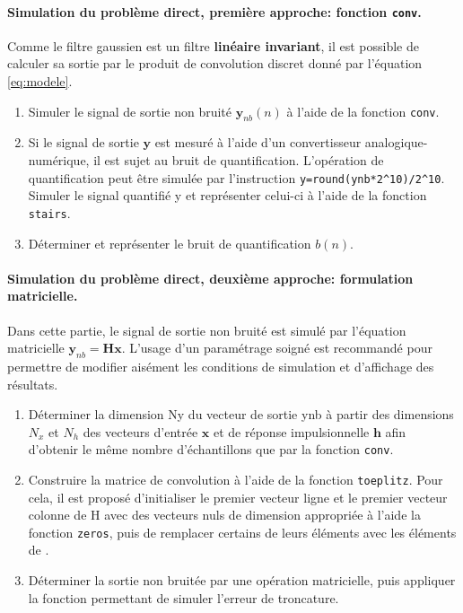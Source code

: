\paragraph{Simulation du problème direct, première approche: fonction \texttt{conv}.} Comme le filtre gaussien est un filtre \textbf{linéaire invariant}, il est possible de calculer sa sortie par le produit de convolution discret donné par l'équation \eqref{eq:modele}.
\begin{enumerate}
	\item Simuler le signal de sortie non bruité $\bm{y}_{nb}(n)$ à l'aide de la fonction \texttt{conv}.
	\item Si le signal de sortie $\bm{y}$ est mesuré à l'aide d'un convertisseur analogique-numérique, il est sujet au bruit de quantification. L'opération de quantification peut être simulée par l'instruction \texttt{y=round(ynb*2\^{}10)/2\^{}10}. Simuler le signal quantifié y et représenter celui-ci à l'aide de la fonction \texttt{stairs}.
	\item Déterminer et représenter le bruit de quantification $b(n)$.
\end{enumerate}

\paragraph{Simulation du problème direct, deuxième approche: formulation matricielle.} Dans cette partie, le signal de sortie non bruité est simulé par l'équation matricielle $\bm{y}_{nb} = \bm{H}\bm{x}$. L'usage d'un paramétrage soigné est recommandé pour permettre de modifier aisément les conditions de simulation et d'affichage des résultats.
\begin{enumerate}
	\item Déterminer la dimension Ny du vecteur de sortie ynb à partir des dimensions $N_x$ et $N_h$ des vecteurs d'entrée $\bm{x}$ et de réponse impulsionnelle $\bm{h}$ afin d'obtenir le même nombre d'échantillons que par la fonction \texttt{conv}.
	\item Construire la matrice de convolution  à l'aide de la fonction \texttt{toeplitz}. Pour cela, il est proposé d'initialiser le premier vecteur ligne et le premier vecteur colonne de H avec des vecteurs nuls de dimension appropriée à l'aide la fonction \texttt{zeros}, puis de remplacer certains de leurs éléments avec les éléments de .
	\item Déterminer la sortie non bruitée par une opération matricielle, puis appliquer la fonction permettant de simuler l'erreur de troncature.
\end{enumerate}


